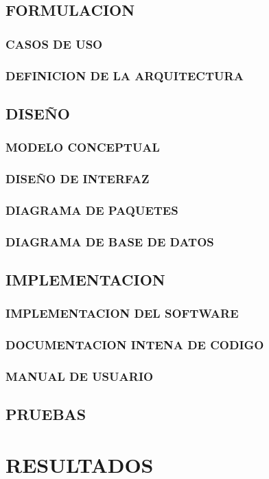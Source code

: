 \documentclass[12pt,letterpaper,oneside]{article}
\begin{document}
\subsection{FORMULACION}
\subsubsection{CASOS DE USO}
\subsubsection{DEFINICION DE LA ARQUITECTURA}
\subsection{DISEÑO}
\subsubsection{MODELO CONCEPTUAL}
\subsubsection{DISEÑO DE INTERFAZ}
\subsubsection{DIAGRAMA DE PAQUETES}
\subsubsection{DIAGRAMA DE BASE DE DATOS}
\subsection{IMPLEMENTACION}
\subsubsection{IMPLEMENTACION DEL SOFTWARE}
\subsubsection{DOCUMENTACION INTENA DE CODIGO}
\subsubsection{MANUAL DE USUARIO}
\subsection{PRUEBAS}

\section{RESULTADOS}
\end{document}
